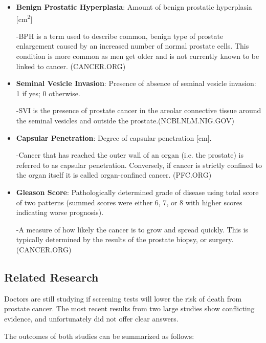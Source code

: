 \begin{itemize}
	\item \textbf{Benign Prostatic Hyperplasia}: Amount of benign prostatic hyperplasia [cm\textsuperscript{2}] \par
		-BPH is a term used to describe common, benign type of prostate enlargement caused by an increased number of normal prostate cells. This condition is more common as men get older and is not currently known to be linked to cancer. (CANCER.ORG)
		
	\item \textbf{Seminal Vesicle Invasion}: Presence of absence of seminal vesicle invasion: 1 if yes; 0 otherwise. \par
		-SVI is the presence of prostate cancer in the areolar connective tissue around the seminal vesicles and outside the prostate.(NCBI.NLM.NIG.GOV)
		
	\item \textbf{Capsular Penetration}: Degree of capsular penetration [cm]. \par
		-Cancer that has reached the outer wall of an organ (i.e. the prostate) is referred to as capsular penetration. Conversely, if cancer is strictly confined to the organ itself it is called organ-confined cancer. (PFC.ORG)
		
	\item \textbf{Gleason Score}: Pathologically determined grade of disease using total score of two patterns (summed scores were either 6, 7, or 8 with higher scores indicating worse prognosis). \par
		-A measure of how likely the cancer is to grow and spread quickly. This is typically determined by the results of the prostate biopsy, or surgery. (CANCER.ORG)
		
\end{itemize}

\subsection{Related Research}

Doctors are still studying if screening tests will lower the risk of death from prostate cancer. The most recent results from two large studies show conflicting evidence, and unfortunately did not offer clear answers. \par

The outcomes of both studies can be summarized as follows:

